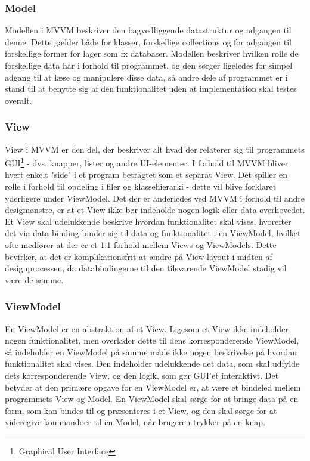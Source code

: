 \subsubsection{Model}
Modellen i MVVM beskriver den bagvedliggende datastruktur og adgangen til denne. Dette gælder både for klasser, forskellige collections og for adgangen til forskellige former for lager som fx databaser. Modellen beskriver hvilken rolle de forskellige data har i forhold til programmet, og den sørger ligeledes for simpel adgang til at læse og manipulere disse data, så andre dele af programmet er i stand til at benytte sig af den funktionalitet uden at implementation skal testes overalt.

\subsubsection{View}
View i MVVM er den del, der beskriver alt hvad der relaterer sig til programmets GUI\footnote{Graphical User Interface} - dvs. knapper, lister og andre UI-elementer. I forhold til MVVM bliver hvert enkelt "side" i et program betragtet som et separat View. Det spiller en rolle i forhold til opdeling i filer og klassehierarki - dette vil blive forklaret yderligere under ViewModel. Det der er anderledes ved MVVM i forhold til andre desigmønstre, er at et View ikke bør indeholde nogen logik eller data overhovedet. Et View skal udelukkende beskrive hvordan funktionalitet skal vises, hvorefter det via data binding binder sig til data og funktionalitet i en ViewModel, hvilket ofte medfører at der er et 1:1 forhold mellem Views og ViewModels. Dette bevirker, at det er komplikationsfrit at ændre på View-layout i midten af designprocessen, da databindingerne til den tilsvarende ViewModel stadig vil være de samme.

\subsubsection{ViewModel}
En ViewModel er en abstraktion af et View. Ligesom et View ikke indeholder nogen funktionalitet, men overlader dette til dens korresponderende ViewModel, så indeholder en ViewModel på samme måde ikke nogen beskrivelse på hvordan funktionalitet skal vises. Den indeholder udelukkende det data, som skal udfylde dets korresponderende View, og den logik, som gør GUI'et interaktivt. Det betyder at den primære opgave for en ViewModel er, at være et bindeled mellem programmets View og Model. En ViewModel skal sørge for at bringe data på en form, som kan bindes til og præsenteres i et View, og den skal sørge for at videregive kommandoer til en Model, når brugeren trykker på en knap.\\

